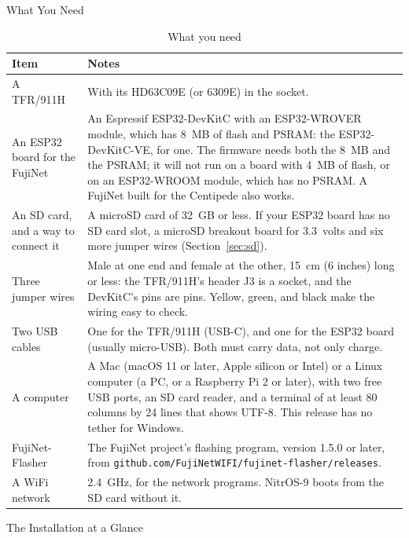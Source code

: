\documentclass[10pt,twoside,openany]{book}
\makeatletter
\newcommand{\file}[1]{\texttt{#1}}           %
\renewcommand{\section}{\@startsection{section}{1}{0pt}{3.2ex plus 1ex}{1.2ex}%
  {\sffamily\bfseries\large}}
\makeatother
\begin{document}
\section{What You Need}

\begin{table}[H]
\caption{What you need}\label{tab:need}
\begin{tabularx}{\linewidth}{@{}>{\raggedright\arraybackslash}p{1.45in}X@{}}
\toprule
\textbf{Item} & \textbf{Notes}\\
\midrule
A TFR/911H & With its HD63C09E (or 6309E) in the socket.\\
An ESP32 board for the FujiNet & An Espressif ESP32-DevKitC with an
ESP32-WROVER module, which has 8~MB of flash and PSRAM: the
ESP32-DevKitC-VE, for one. The firmware needs both the 8~MB and the PSRAM;
it will not run on a board with 4~MB of flash, or on an ESP32-WROOM
module, which has no PSRAM. A FujiNet built for the Centipede also
works.\\
An SD card, and a way to connect it & A microSD card of 32~GB or less.
If your ESP32 board has no SD card slot, a microSD breakout board for
3.3~volts and six more jumper wires (Section~\ref{sec:sd}).\\
Three jumper wires & Male at one end and female at the other, 15~cm (6
inches) long or less: the TFR/911H's header J3 is a socket, and the
DevKitC's pins are pins. Yellow, green, and black make the wiring easy to
check.\\
Two USB cables & One for the TFR/911H (USB-C), and one for the ESP32
board (usually micro-USB). Both must carry data, not only charge.\\
A computer & A Mac (macOS 11 or later, Apple silicon or Intel) or a
Linux computer (a PC, or a Raspberry Pi 2 or later), with two free USB
ports, an SD card reader, and a terminal of at least 80 columns by 24
lines that shows UTF-8. This release has no tether for Windows.\\
FujiNet-Flasher & The FujiNet project's flashing program, version 1.5.0 or
later, from \file{github.com/FujiNetWIFI/fujinet-flasher/releases}.\\
A WiFi network & 2.4~GHz, for the network programs. NitrOS-9 boots from
the SD card without it.\\
\bottomrule
\end{tabularx}
\end{table}

\section{The Installation at a Glance}
\end{document}
